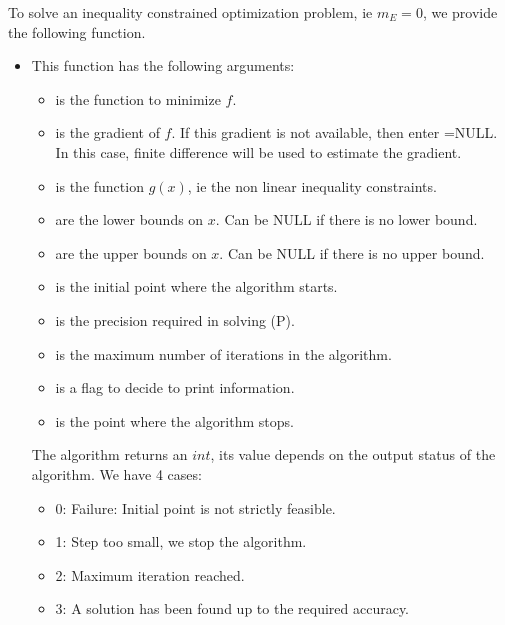 To solve an inequality constrained optimization problem, ie $m_E=0$, we provide the following function.
\begin{itemize}
\item {}
  \sshortdescribe This function has the following arguments:

  \begin{itemize}
  \item {} is the function to minimize $f$.
  \item {} is the gradient of $f$. If this gradient is not available, then enter =NULL. In this case, finite difference will be used to estimate the gradient.
  \item {} is the function $g(x)$, ie the non linear inequality constraints.
  \item {} are the lower bounds on $x$. Can be NULL if there is no
    lower bound.
  \item {} are the upper bounds on $x$. Can be NULL if there is no
    upper bound.
  \item {} is the initial point where the algorithm starts.
  \item {} is the precision required in solving (P).
  \item {} is the maximum number of iterations in the algorithm.
  \item {} is a flag to decide to print information.
  \item {} is the point where the algorithm stops.
  \end{itemize}

  The algorithm returns an $int$, its value depends on the output status of the algorithm. We have 4 cases:

  \begin{itemize}
  \item 0: Failure: Initial point is not strictly feasible.
  \item 1: Step too small, we stop the algorithm.
  \item 2: Maximum iteration reached.
  \item 3: A solution has been found up to the required accuracy.
  \end{itemize}


\end{itemize}
